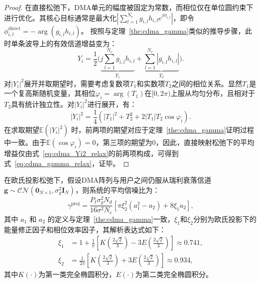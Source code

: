 \begin{proof}
	在直接松弛下，DMA单元的幅度被固定为常数，而相位仅在单位圆约束下进行优化。其核心目标通常是最大化$\left| \sum_{l=1}^{N_e} g_{i,l} h_{i,l} e^{j\phi_{i,l}} \right|$，即令$\phi_{i,l}^{\mathrm{direct}} = -\arg(g_{i,l}h_{i,l})$。
	按照与定理~\ref{the:cdma_gamma}类似的推导步骤，此时单条波导上的有效信道增益变为：
	\begin{equation}
		Y_i= \frac{1}{2} \Big ( \underbrace{j \sum_{l=1}^{N_e} g_{i,l} h_{i,l}}_{T_1} + \underbrace{\sum_{l=1}^{N_e} |g_{i,l} h_{i,l}|}_{T_2} \Big ).
	\end{equation}
	对$|Y_i|^2$展开并取期望时，需要考虑复数项$T_1$和实数项$T_2$之间的相位关系。显然$T_1$是一个复高斯随机变量，其相位$\varphi_i = \arg(T_1)$在$[0, 2\pi)$上服从均匀分布，且相对于$T_2$具有统计独立性。对$|Y_i|^2$进行展开，有：
	\begin{equation}\label{eq:cdma_Yi2_relax}
		|Y_i|^2 = \frac{1}{4} \left( |T_1|^2 + T_2^2 + 2|T_1|T_2 \cos\varphi_i \right).
	\end{equation}
	在求取期望$\mathbb{E}(|Y_i|^2)$ 时，前两项的期望对应于定理~\ref{the:cdma_gamma}证明过程中一致。由于$\mathbb{E}(\cos\varphi_i) = 0$，第三项的期望为0，因此，直接映射松弛下的平均增益仅由式~\eqref{eq:cdma_Yi2_relax}的前两项构成，可得到式~\eqref{eq:cdma_gamma_relax}，证毕。
\end{proof}

\begin{corollary}\label{cor:cdma_gamma_proj}
	在欧氏投影松弛下，假设DMA阵列与用户之间仍服从瑞利衰落信道$\bm g \sim \mathcal{CN}(\bm 0_{N\times1}, \sigma_g^2 \bm I_N)$，则系统的平均信噪比为：
	\begin{equation}\label{eq:cdma_gamma_proj}
		\gamma^{\mathrm{proj}} = 
		\frac{P_t \sigma_g^2 N_d}{16 \sigma^2 N_e} 
		\left[ \pi \xi_2^2 (a_1^2-a_2) + 8\xi_1 a_2 \right],
	\end{equation}
	其中 $a_1$ 和 $a_2$ 的定义与定理~\ref{the:cdma_gamma}一致，$\xi_1$和$\xi_2$分别为欧氏投影下的能量修正因子和相位效率因子，其解析表达式如下：
	\begin{align}
		\xi_1 &=1 + \frac{1}{\pi} \left[ K(\frac{2\sqrt{2}}{3}) - 3 E(\frac{2\sqrt{2}}{3}) \right]\approx 0.741,\\
		\xi_2 &= \frac{1}{2\pi} \left[ K(\frac{2\sqrt{2}}{3}) + 3 E(\frac{2\sqrt{2}}{3}) \right] \approx 0.934,
	\end{align}
	其中$K(\cdot)$为第一类完全椭圆积分，$E(\cdot)$为第二类完全椭圆积分。
\end{corollary}

